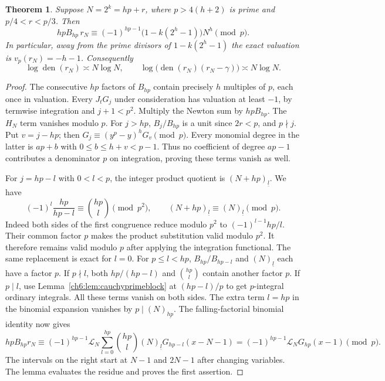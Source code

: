 \documentclass[11pt,a4paper,oneside,openany]{report}
\newtheorem{theorem}{Theorem}[section]
\theoremstyle{remark}\newtheorem{remark}[theorem]{Remark}
\numberwithin{equation}{section}
\begin{document}
\begin{theorem}\label{ch6:th:quadfactorial}
Suppose $N=2^k=hp+r$, where $p>4(h+2)$ is prime and $p/4<r<p/3$. Then
\[
 hpB_{hp}\,r_N\equiv(-1)^{hp-1}\bigl(1-k(2^h-1)\bigr)N^h\pmod p.
\]
In particular, away from the prime divisors of $1-k(2^h-1)$ the exact valuation is $v_p(r_N)=-h-1$. Consequently
\[
 \log\operatorname{den}(r_N)\asymp N\log N,\qquad
 \log\bigl(\operatorname{den}(r_N)(r_N-\gamma)\bigr)\asymp N\log N.
\]
\end{theorem}
\begin{proof}
The consecutive $hp$ factors of $B_{hp}$ contain precisely $h$ multiples of $p$, each once in valuation. Every $J_tG_j$ under consideration has valuation at least $-1$, by termwise integration and $j+1<p^2$. Multiply the Newton sum by $hpB_{hp}$. The $H_N$ term vanishes modulo $p$. For $j>hp$, $B_j/B_{hp}$ is a unit since $2r<p$, and $p\nmid j$. Put $v=j-hp$; then $G_j\equiv(y^p-y)^hG_v\pmod p$. Every monomial degree in the latter is $ap+b$ with $0\le b\le h+v<p-1$. Thus no coefficient of degree $ap-1$ contributes a denominator $p$ on integration, proving these terms vanish as well.

For $j=hp-l$ with $0<l<p$, the integer product quotient is $(N+hp)_{\underline l}$. We have
\[
 (-1)^l\frac{hp}{hp-l}\equiv \binom{hp}{l}\pmod{p^2},
 \qquad (N+hp)_{\underline l}\equiv (N)_{\underline l}\pmod p.
\]
Indeed both sides of the first congruence reduce modulo $p^2$ to $(-1)^{l-1}hp/l$. Their common factor $p$ makes the product substitution valid modulo $p^2$. It therefore remains valid modulo $p$ after applying the integration functional. The same replacement is exact for $l=0$. For $p\le l<hp$, $B_{hp}/B_{hp-l}$ and $(N)_{\underline l}$ each have a factor $p$. If $p\nmid l$, both $hp/(hp-l)$ and $\binom{hp}{l}$ contain another factor $p$. If $p\mid l$, use Lemma~\ref{ch6:lem:cauchyprimeblock} at $(hp-l)/p$ to get $p$-integral ordinary integrals. All these terms vanish on both sides. The extra term $l=hp$ in the binomial expansion vanishes by $p\mid(N)_{\underline{hp}}$. The falling-factorial binomial identity now gives
\[
 hpB_{hp}r_N\equiv (-1)^{hp-1}\mathcal L_N\sum_{l=0}^{hp}\binom{hp}{l}(N)_{\underline l}G_{hp-l}(x-N-1)
 =(-1)^{hp-1}\mathcal L_N G_{hp}(x-1)\pmod p.
\]
The intervals on the right start at $N-1$ and $2N-1$ after changing variables. The lemma evaluates the residue and proves the first assertion.


\end{proof}
\end{document}
